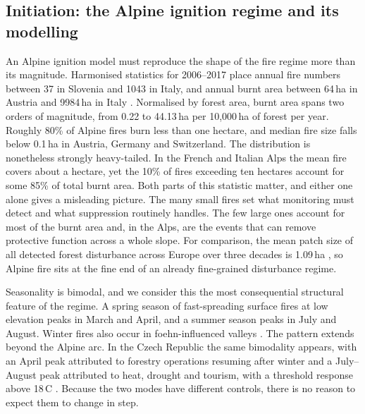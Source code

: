 \documentclass[11pt,a4paper]{article}
\begin{document}
\subsection{Initiation: the Alpine ignition regime and its modelling}

An Alpine ignition model must reproduce the shape of the fire regime more than its magnitude. Harmonised statistics for 2006--2017 place annual fire numbers between 37 in Slovenia and 1043 in Italy, and annual burnt area between 64\,ha in Austria and 9984\,ha in Italy \citep{muller_forest_2020}. Normalised by forest area, burnt area spans two orders of magnitude, from 0.22 to 44.13\,ha per 10{,}000\,ha of forest per year. Roughly 80\% of Alpine fires burn less than one hectare, and median fire size falls below 0.1\,ha in Austria, Germany and Switzerland. The distribution is nonetheless strongly heavy-tailed. In the French and Italian Alps the mean fire covers about a hectare, yet the 10\% of fires exceeding ten hectares account for some 85\% of total burnt area. Both parts of this statistic matter, and either one alone gives a misleading picture. The many small fires set what monitoring must detect and what suppression routinely handles. The few large ones account for most of the burnt area and, in the Alps, are the events that can remove protective function across a whole slope. For comparison, the mean patch size of all detected forest disturbance across Europe over three decades is 1.09\,ha \citep{senf_mapping_2021}, so Alpine fire sits at the fine end of an already fine-grained disturbance regime.

Seasonality is bimodal, and we consider this the most consequential structural feature of the regime. A spring season of fast-spreading surface fires at low elevation peaks in March and April, and a summer season peaks in July and August. Winter fires also occur in foehn-influenced valleys \citep{valese_wildfires_2011}. The pattern extends beyond the Alpine arc. In the Czech Republic the same bimodality appears, with an April peak attributed to forestry operations resuming after winter and a July--August peak attributed to heat, drought and tourism, with a threshold response above 18\,\degree C \citep{bercak_combination_2024}. Because the two modes have different controls, there is no reason to expect them to change in step.
\end{document}
